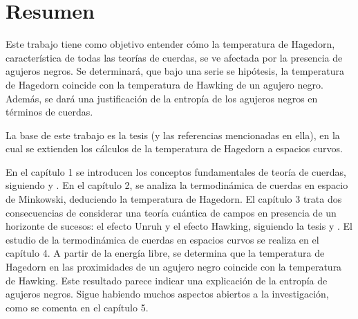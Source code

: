 \chapter*{Resumen}

Este trabajo tiene como objetivo entender cómo la temperatura de Hagedorn, 
característica de todas las teorías de cuerdas, se ve afectada por la presencia de agujeros
negros.
Se determinará, que bajo una serie se hipótesis, la temperatura de Hagedorn coincide con la
temperatura de Hawking de un agujero negro.
Además, se dará una justificación de la entropía de los agujeros negros en términos de cuerdas.

La base de este trabajo es la tesis \cite{Mertens2015} (y las referencias mencionadas en ella), en la cual se extienden los cálculos 
de la temperatura de Hagedorn a espacios curvos.

En el capítulo 1 se introducen los conceptos fundamentales de teoría de cuerdas, siguiendo \cite{Tong:2009np} y \cite{Mertens2015}. 
En el capítulo 2, se analiza la termodinámica de cuerdas en espacio de Minkowski, deduciendo la temperatura de Hagedorn.
El capítulo 3 trata dos consecuencias de considerar una teoría cuántica de campos 
en presencia de un horizonte de sucesos:  el efecto Unruh y el efecto Hawking, siguiendo la tesis \cite{Barbado:2015uua} y \cite{Susskind}.
El estudio de la termodinámica de cuerdas en espacios curvos se realiza en el capítulo 4.
A partir de la energía libre, se determina que la temperatura de Hagedorn en las proximidades
de un agujero negro coincide con la temperatura de Hawking.
Este resultado parece indicar una explicación de la entropía de agujeros negros.
Sigue habiendo muchos aspectos abiertos a la investigación, como se comenta en el capítulo 5.
